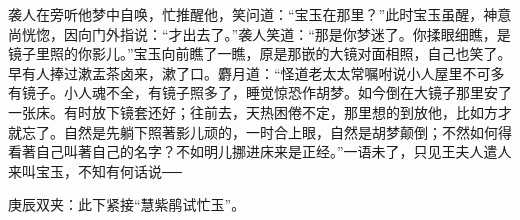 \begin{parag}
    袭人在旁听他梦中自唤，忙推醒他，笑问道：“宝玉在那里？”此时宝玉虽醒，神意尚恍惚，因向门外指说：“才出去了。”袭人笑道：“那是你梦迷了。你揉眼细瞧，是镜子里照的你影儿。”宝玉向前瞧了一瞧，原是那嵌的大镜对面相照，自己也笑了。早有人捧过漱盂茶卤来，漱了口。麝月道：“怪道老太太常嘱咐说小人屋里不可多有镜子。小人魂不全，有镜子照多了，睡觉惊恐作胡梦。如今倒在大镜子那里安了一张床。有时放下镜套还好；往前去，天热困倦不定，那里想的到放他，比如方才就忘了。自然是先躺下照著影儿顽的，一时合上眼，自然是胡梦颠倒；不然如何得看著自己叫著自己的名字？不如明儿挪进床来是正经。”一语未了，只见王夫人遣人来叫宝玉，不知有何话说──\begin{note}庚辰双夹：此下紧接“慧紫鹃试忙玉”。\end{note}
\end{parag}
